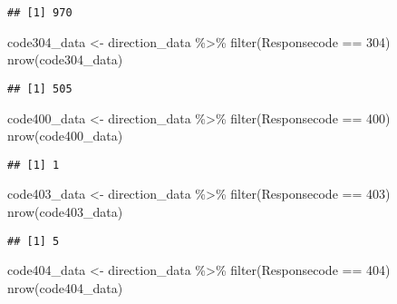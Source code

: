 \documentclass[
]{article}
\newenvironment{Shaded}{\begin{snugshade}}{\end{snugshade}}
\newcommand{\DecValTok}[1]{\textcolor[rgb]{0.00,0.00,0.81}{#1}}
\newcommand{\FunctionTok}[1]{\textcolor[rgb]{0.00,0.00,0.00}{#1}}
\newcommand{\NormalTok}[1]{#1}
\newcommand{\OtherTok}[1]{\textcolor[rgb]{0.56,0.35,0.01}{#1}}
\newcommand{\SpecialCharTok}[1]{\textcolor[rgb]{0.00,0.00,0.00}{#1}}
\begin{document}
\begin{verbatim}
## [1] 970
\end{verbatim}

\begin{Shaded}
\begin{Highlighting}[]
\NormalTok{code304\_data }\OtherTok{\textless{}{-}}\NormalTok{ direction\_data }\SpecialCharTok{\%\textgreater{}\%} \FunctionTok{filter}\NormalTok{(Responsecode }\SpecialCharTok{==} \DecValTok{304}\NormalTok{)}
\FunctionTok{nrow}\NormalTok{(code304\_data)}
\end{Highlighting}
\end{Shaded}

\begin{verbatim}
## [1] 505
\end{verbatim}

\begin{Shaded}
\begin{Highlighting}[]
\NormalTok{code400\_data }\OtherTok{\textless{}{-}}\NormalTok{ direction\_data }\SpecialCharTok{\%\textgreater{}\%} \FunctionTok{filter}\NormalTok{(Responsecode }\SpecialCharTok{==} \DecValTok{400}\NormalTok{)}
\FunctionTok{nrow}\NormalTok{(code400\_data)}
\end{Highlighting}
\end{Shaded}

\begin{verbatim}
## [1] 1
\end{verbatim}

\begin{Shaded}
\begin{Highlighting}[]
\NormalTok{code403\_data }\OtherTok{\textless{}{-}}\NormalTok{ direction\_data }\SpecialCharTok{\%\textgreater{}\%} \FunctionTok{filter}\NormalTok{(Responsecode }\SpecialCharTok{==} \DecValTok{403}\NormalTok{)}
\FunctionTok{nrow}\NormalTok{(code403\_data)}
\end{Highlighting}
\end{Shaded}

\begin{verbatim}
## [1] 5
\end{verbatim}

\begin{Shaded}
\begin{Highlighting}[]
\NormalTok{code404\_data }\OtherTok{\textless{}{-}}\NormalTok{ direction\_data }\SpecialCharTok{\%\textgreater{}\%} \FunctionTok{filter}\NormalTok{(Responsecode }\SpecialCharTok{==} \DecValTok{404}\NormalTok{)}
\FunctionTok{nrow}\NormalTok{(code404\_data)}
\end{Highlighting}
\end{Shaded}
\end{document}
